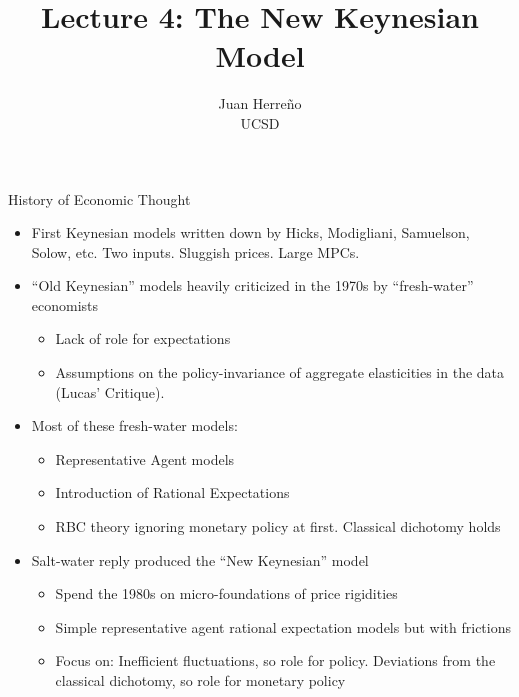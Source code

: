 \documentclass[11pt,aspectratio=169,xcolor={dvipsnames},hyperref={pdftex,pdfpagemode=UseNone,hidelinks,pdfdisplaydoctitle=true},usepdftitle=false]{beamer}
\title{Lecture 4: The New Keynesian Model}
\author{Juan Herre\~{n}o\\UCSD}
\begin{document}
\maketitle

\begin{frame}{History of Economic Thought}
\begin{itemize}
\item First Keynesian models written down by Hicks, Modigliani, Samuelson, Solow, etc. Two inputs. Sluggish prices. Large MPCs.
\pause
\item ``Old Keynesian'' models heavily criticized in the 1970s by ``fresh-water'' economists
\begin{itemize}
\item Lack of role for expectations
\item Assumptions on the policy-invariance of aggregate elasticities in the data (Lucas' Critique).
\end{itemize}
\pause
\item Most of these fresh-water models:
\begin{itemize}
\item Representative Agent models
\item Introduction of Rational Expectations
\item RBC theory ignoring monetary policy at first. Classical dichotomy holds
\end{itemize}
\pause
\item Salt-water reply produced the ``New Keynesian'' model
\begin{itemize}
\item Spend the 1980s on micro-foundations of price rigidities
\item Simple representative agent rational expectation models but with frictions
\item Focus on: Inefficient fluctuations, so role for policy. Deviations from the classical dichotomy, so role for monetary policy
\end{itemize}
\end{itemize}
\end{frame}
\end{document}
